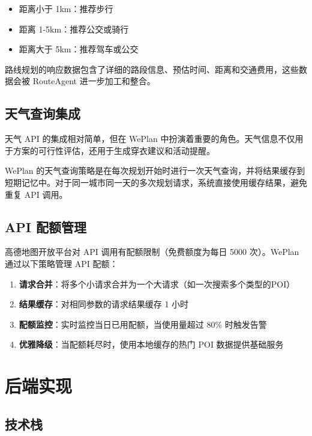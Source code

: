 \documentclass[12pt,a4paper]{ctexart}
\begin{document}
\begin{itemize}[leftmargin=2em]
  \item 距离小于 1km：推荐步行
  \item 距离 1-5km：推荐公交或骑行
  \item 距离大于 5km：推荐驾车或公交
\end{itemize}

路线规划的响应数据包含了详细的路段信息、预估时间、距离和交通费用，这些数据会被 RouteAgent 进一步加工和整合。

\subsection{天气查询集成}

天气 API 的集成相对简单，但在 WePlan 中扮演着重要的角色。天气信息不仅用于方案的可行性评估，还用于生成穿衣建议和活动提醒。

WePlan 的天气查询策略是在每次规划开始时进行一次天气查询，并将结果缓存到短期记忆中。对于同一城市同一天的多次规划请求，系统直接使用缓存结果，避免重复 API 调用。

\subsection{API 配额管理}

高德地图开放平台对 API 调用有配额限制（免费额度为每日 5000 次）。WePlan 通过以下策略管理 API 配额：

\begin{enumerate}[leftmargin=2em]
  \item \textbf{请求合并}：将多个小请求合并为一个大请求（如一次搜索多个类型的POI）
  \item \textbf{结果缓存}：对相同参数的请求结果缓存 1 小时
  \item \textbf{配额监控}：实时监控当日已用配额，当使用量超过 80\% 时触发告警
  \item \textbf{优雅降级}：当配额耗尽时，使用本地缓存的热门 POI 数据提供基础服务
\end{enumerate}

\newpage

\section{后端实现}

\subsection{技术栈}
\end{document}
